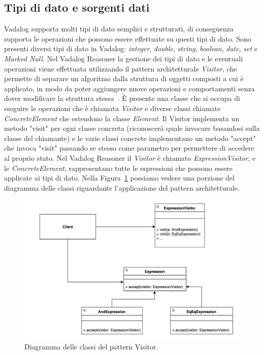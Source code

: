 \subsection{Tipi di dato e sorgenti dati}

Vadalog supporta molti tipi di dato semplici e strutturati, di conseguenza supporta le operazioni che possono essere effettuate su questi tipi di dato. Sono presenti diversi tipi di dato in Vadalog: \emph{integer}, \emph{double}, \emph{string}, \emph{boolean}, \emph{date}, \emph{set} e \emph{Marked Null}. \newline
Nel Vadalog Reasoner la gestione dei tipi di dato e le eventuali operazioni viene effettuata utilizzando il pattern architetturale \emph{Visitor}, che permette di separare un algoritmo dalla struttura di oggetti composti a cui è applicato, in modo da poter aggiungere nuove operazioni e comportamenti senza dover modificare la struttura stessa~\cite{gamma1995design}. È presente una classe che si occupa di eseguire le operazioni che è chiamata \emph{Visitor} e diverse classi chiamate \emph{ConcreteElement} che estendono la classe \emph{Element}. Il Visitor implementa un metodo "visit" per ogni classe concreta (riconoscerà quale invocare basandosi sulla classe del chiamante) e le varie classi concrete implementano un metodo "accept" che invoca "visit" passando se stesso come parametro per permettere di accedere al proprio stato. \newline
Nel Vadalog Reasoner il \emph{Visitor} è chiamato \emph{ExpressionVisitor}, e le \emph{ConcreteElement}, rappresentano tutte le espressioni che possono essere applicate ai tipi di dato. Nella Figura~\ref{fig:visitoruml} possiamo vedere una porzione del diagramma delle classi riguardante l'applicazione del pattern architetturale. 
\begin{figure}[h]
	\centering
	\includegraphics[width=0.8\linewidth]{figure/visitor_uml}
	\caption{Diagramma delle classi del pattern Visitor.}
	\label{fig:visitoruml}
\end{figure}

